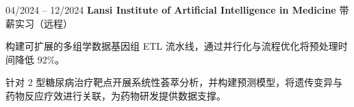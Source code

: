 \begin{twocolentry}{04/2024 – 12/2024} \textbf{Lansi Institute of Artificial Intelligence in Medicine}
    \newline 带薪实习（远程） \end{twocolentry}
\begin{onecolentry}
\begin{highlights}
\item 构建可扩展的多组学数据基因组 ETL 流水线，通过并行化与流程优化将预处理时间降低 92\%。
\item 针对 2 型糖尿病治疗靶点开展系统性荟萃分析，并构建预测模型，将遗传变异与药物反应疗效进行关联，为药物研发提供数据支撑。
\end{highlights}
\end{onecolentry}
